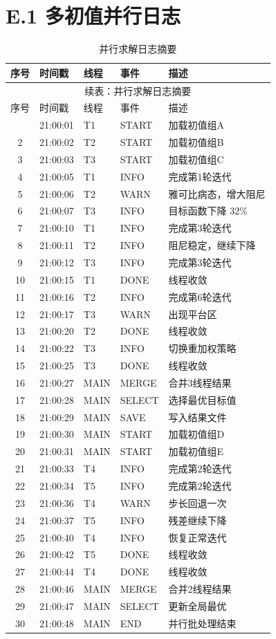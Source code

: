 \section*{E.1 多初值并行日志}
{
\footnotesize
\begin{longtable}{cllll}
\caption{并行求解日志摘要}\\
\toprule
序号 & 时间戳 & 线程 & 事件 & 描述\\
\midrule
\endfirsthead
\multicolumn{5}{c}{续表：并行求解日志摘要}\\
\toprule
序号 & 时间戳 & 线程 & 事件 & 描述\\
\midrule
\endhead
\bottomrule
\endfoot
1&21:00:01&T1&START&加载初值组A\\
2&21:00:02&T2&START&加载初值组B\\
3&21:00:03&T3&START&加载初值组C\\
4&21:00:05&T1&INFO&完成第1轮迭代\\
5&21:00:06&T2&WARN&雅可比病态，增大阻尼\\
6&21:00:07&T3&INFO&目标函数下降 32\%\\
7&21:00:10&T1&INFO&完成第3轮迭代\\
8&21:00:11&T2&INFO&阻尼稳定，继续下降\\
9&21:00:12&T3&INFO&完成第3轮迭代\\
10&21:00:15&T1&DONE&线程收敛\\
11&21:00:16&T2&INFO&完成第6轮迭代\\
12&21:00:17&T3&WARN&出现平台区\\
13&21:00:20&T2&DONE&线程收敛\\
14&21:00:22&T3&INFO&切换重加权策略\\
15&21:00:25&T3&DONE&线程收敛\\
16&21:00:27&MAIN&MERGE&合并3线程结果\\
17&21:00:28&MAIN&SELECT&选择最优目标值\\
18&21:00:29&MAIN&SAVE&写入结果文件\\
19&21:00:30&MAIN&START&加载初值组D\\
20&21:00:31&MAIN&START&加载初值组E\\
21&21:00:33&T4&INFO&完成第2轮迭代\\
22&21:00:34&T5&INFO&完成第2轮迭代\\
23&21:00:36&T4&WARN&步长回退一次\\
24&21:00:37&T5&INFO&残差继续下降\\
25&21:00:40&T4&INFO&恢复正常迭代\\
26&21:00:42&T5&DONE&线程收敛\\
27&21:00:44&T4&DONE&线程收敛\\
28&21:00:46&MAIN&MERGE&合并2线程结果\\
29&21:00:47&MAIN&SELECT&更新全局最优\\
30&21:00:48&MAIN&END&并行批处理结束\\
\end{longtable}
}
